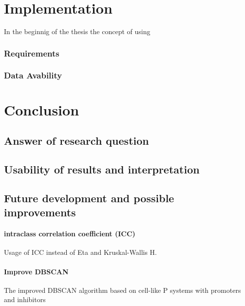 \documentclass[a4paper,headsepline,footsepline,fontsize=11pt,BCOR=12mm,DIV=12]{report}
\begin{document}
\chapter{Implementation}
In the beginnig of the thesis the concept of using 

\subsection{Requirements}



\subsection{Data Avability}




\chapter{Conclusion}

\section{Answer of research question}

\section{Usability of results and interpretation}

\section{Future development and possible improvements} 

\subsubsection{intraclass correlation coefficient (ICC)}
Usage of ICC instead of Eta and Kruskal-Wallis H.

\subsubsection{Improve DBSCAN}
The improved DBSCAN algorithm based on cell-like P systems with promoters and inhibitors
\end{document}
